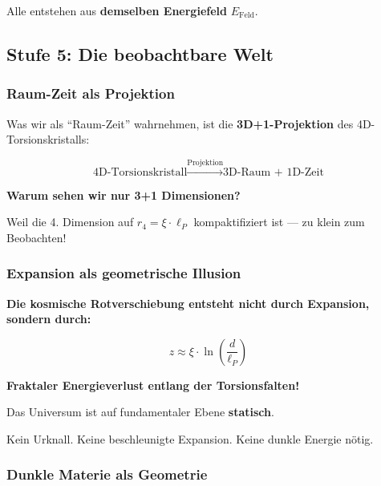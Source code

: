 	Alle entstehen aus \textbf{demselben Energiefeld} $E_{\text{Feld}}$.
	
	\subsection{Stufe 5: Die beobachtbare Welt}
	
	\subsubsection{Raum-Zeit als Projektion}
	
	Was wir als \enquote{Raum-Zeit} wahrnehmen, ist die \textbf{3D+1-Projektion} des 4D-Torsionskristalls:
	
	\begin{equation}
		\text{4D-Torsionskristall} \xrightarrow{\text{Projektion}} \text{3D-Raum + 1D-Zeit}
	\end{equation}
	
	\textbf{Warum sehen wir nur 3+1 Dimensionen?}
	
	Weil die 4. Dimension auf $r_4 = \xi \cdot \ell_P$ kompaktifiziert ist — zu klein zum Beobachten!
	
	\subsubsection{Expansion als geometrische Illusion}
	
	\begin{keyresult}
		\textbf{Die kosmische Rotverschiebung entsteht nicht durch Expansion, sondern durch:}
		
		\begin{equation}
			\boxed{z \approx \xi \cdot \ln\left(\frac{d}{\ell_P}\right)}
		\end{equation}
		
		\textbf{Fraktaler Energieverlust entlang der Torsionsfalten!}
		
		\vspace{0.3cm}
		
		Das Universum ist auf fundamentaler Ebene \textbf{statisch}.
		
		Kein Urknall. Keine beschleunigte Expansion. Keine dunkle Energie nötig.
	\end{keyresult}
	
	\subsubsection{Dunkle Materie als Geometrie}
	
